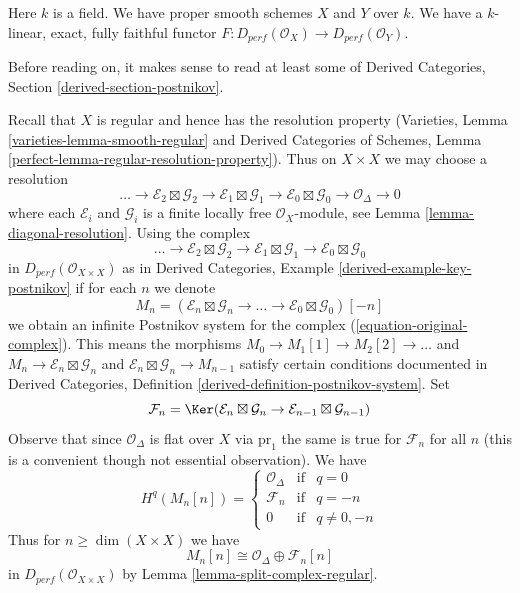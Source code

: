 \begin{situation}
\label{situation-fully-faithful}
Here $k$ is a field. We have proper smooth schemes $X$ and $Y$ over $k$.
We have a $k$-linear, exact, fully faithful functor
$F : D_{perf}(\mathcal{O}_X) \to D_{perf}(\mathcal{O}_Y)$.
\end{situation}

\noindent
Before reading on, it makes sense to read at least some of
Derived Categories, Section \ref{derived-section-postnikov}.

\medskip\noindent
Recall that $X$ is regular and hence has the resolution property
(Varieties, Lemma \ref{varieties-lemma-smooth-regular} and
Derived Categories of Schemes, Lemma
\ref{perfect-lemma-regular-resolution-property}). Thus
on $X \times X$ we may choose a resolution
$$
\ldots \to
\mathcal{E}_2 \boxtimes \mathcal{G}_2 \to
\mathcal{E}_1 \boxtimes \mathcal{G}_1 \to
\mathcal{E}_0 \boxtimes \mathcal{G}_0 \to
\mathcal{O}_\Delta \to 0
$$
where each $\mathcal{E}_i$ and $\mathcal{G}_i$ is a finite locally
free $\mathcal{O}_X$-module, see Lemma \ref{lemma-diagonal-resolution}.
Using the complex
\begin{equation}
\label{equation-original-complex}
\ldots \to
\mathcal{E}_2 \boxtimes \mathcal{G}_2 \to
\mathcal{E}_1 \boxtimes \mathcal{G}_1 \to
\mathcal{E}_0 \boxtimes \mathcal{G}_0
\end{equation}
in $D_{perf}(\mathcal{O}_{X \times X})$ as in
Derived Categories, Example \ref{derived-example-key-postnikov}
if for each $n$ we denote
$$
M_n = (\mathcal{E}_n \boxtimes \mathcal{G}_n \to \ldots \to
\mathcal{E}_0 \boxtimes \mathcal{G}_0)[-n]
$$
we obtain an infinite Postnikov system for the complex
(\ref{equation-original-complex}). This means
the morphisms $M_0 \to M_1[1] \to M_2[2] \to \ldots$ and
$M_n \to \mathcal{E}_n \boxtimes \mathcal{G}_n$ and
$\mathcal{E}_n \boxtimes \mathcal{G}_n \to M_{n - 1}$
satisfy certain conditions documented in
Derived Categories, Definition \ref{derived-definition-postnikov-system}.
Set
$$
\mathcal{F}_n = \Ker(\mathcal{E}_n \boxtimes \mathcal{G}_n \to
\mathcal{E}_{n - 1} \boxtimes \mathcal{G}_{n - 1})
$$
Observe that since $\mathcal{O}_\Delta$ is flat over $X$ via $\text{pr}_1$
the same is true for $\mathcal{F}_n$ for all $n$ (this is a convenient though
not essential observation). We have
$$
H^q(M_n[n]) = \left\{
\begin{matrix}
\mathcal{O}_\Delta & \text{if} & q = 0 \\
\mathcal{F}_n & \text{if} & q = -n \\
0 & \text{if} & q \not = 0, -n
\end{matrix}
\right.
$$
Thus for $n \geq \dim(X \times X)$ we have
$$
M_n[n] \cong \mathcal{O}_\Delta \oplus \mathcal{F}_n[n]
$$
in $D_{perf}(\mathcal{O}_{X \times X})$ by
Lemma \ref{lemma-split-complex-regular}.

